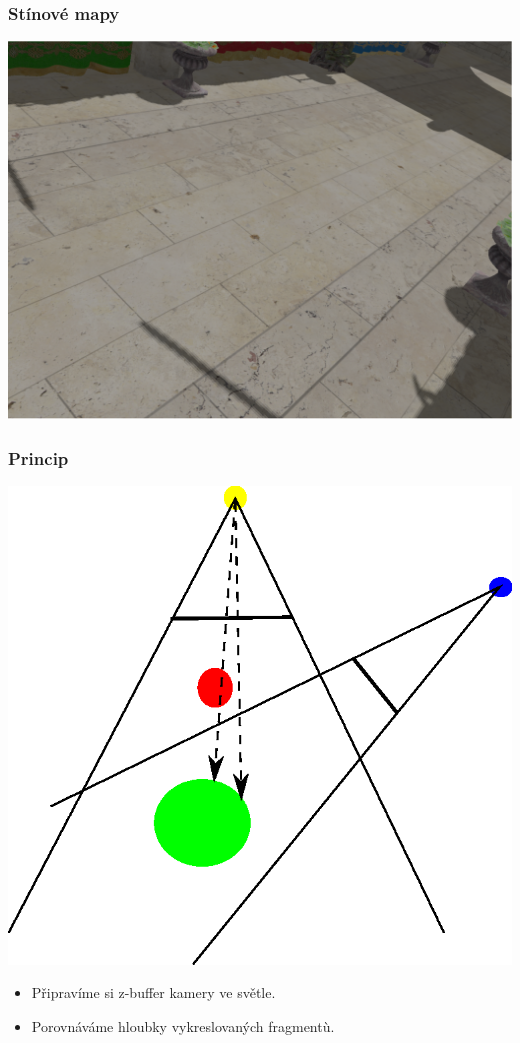 \begin{frame}
    \frametitle{Stínové mapy}

    \includegraphics[width=\textwidth]{pics/shadows/shadowMapping/pcf_nearest.eps}
\end{frame}

\begin{frame}
    \frametitle{Princip}
    \includegraphics[height=.75\textheight]{pics/shadows/shadowMapping/smap.eps}
    \begin{itemize}
        \item Připravíme si z-buffer kamery ve světle.
        \item Porovnáváme hloubky vykreslovaných fragmentù.
    \end{itemize}
\end{frame}

